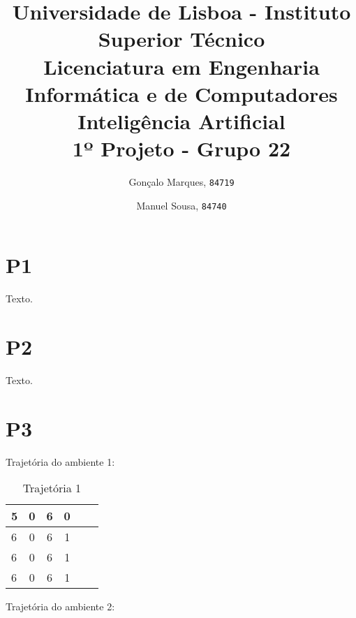 \documentclass{scrartcl}
\begin{document}

\title{
	\textnormal{
	\LARGE Universidade de Lisboa - Instituto Superior Técnico\\
	\Large Licenciatura em Engenharia Informática e de Computadores\\
	\Large Inteligência Artificial
\\}
	\LARGE1º Projeto - Grupo 22
	\vspace{-1ex}
	}
\author{Gonçalo Marques,
	\texttt{84719}
	\and
	Manuel Sousa,
	\texttt{84740}
}
\date{	\vspace{-1ex}
		\vspace{-4ex}
	}
\maketitle

\section*{P1}

Texto.\par

\section*{P2}

Texto.\par

\section*{P3}

Trajetória do ambiente 1:\par

	\begin{table}[h!]
	  \centering
	  \caption{Trajetória 1}
	  \label{tab:Trajetória 1}
	  \begin{tabular}{|l|c|c|c|c|r|}
	  	\hline
	    5 & 0 & 6 & 0\\
	    \hline
	    6 & 0 & 6 & 1\\
	    \hline
	    6 & 0 & 6 & 1\\
	    \hline
	    6 & 0 & 6 & 1\\
	    \hline
	  \end{tabular}
	\end{table}
	\par

Trajetória do ambiente 2:\par
\end{document}

